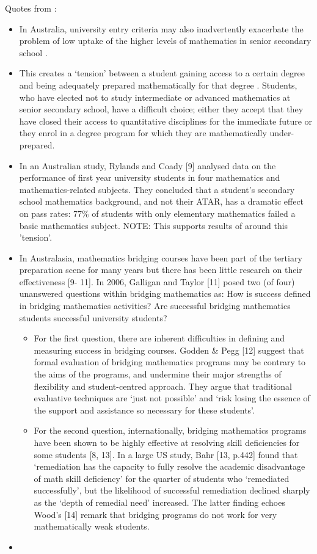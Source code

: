 \documentclass[twoside,12pt,a4paper]{report}
\begin{document}
Quotes from \cite{Poladian2013}:
\begin{itemize}
	\item In Australia, university entry criteria may also inadvertently exacerbate the problem
of low uptake of the higher levels of mathematics in senior secondary school \cite{Varsavsky2010}.
	\item This creates a ‘tension’
between a student gaining access to a certain degree and being adequately prepared
mathematically for that degree \cite{Gordon2013b}. Students, who have elected not to study intermediate or
advanced mathematics at senior secondary school, have a difficult choice; either they accept
that they have closed their access to quantitative disciplines for the immediate future or they
enrol in a degree program for which they are mathematically under-prepared.
	\item In an Australian study, Rylands and
Coady [9] analysed data on the performance of first year university students in four
mathematics and mathematics-related subjects. They concluded that a student’s secondary
school mathematics background, and not their ATAR, has a dramatic effect on pass rates:
77\% of students with only elementary mathematics failed a basic mathematics subject. NOTE: This supports results of \cite{Kajander2005} around this 'tension'.
	\item In Australasia, mathematics bridging courses have been part of the tertiary
preparation scene for many years but there has been little research on their effectiveness [9-
11]. In 2006, Galligan and Taylor [11] posed two (of four) unanswered questions within
bridging mathematics as:
How is success defined in bridging mathematics activities?
Are successful bridging mathematics students successful university students?
	\begin{itemize}
		\item For the first question, there are inherent difficulties in defining and measuring success
in bridging courses. Godden \& Pegg [12] suggest that formal evaluation of bridging
mathematics programs may be contrary to the aims of the programs, and undermine their
major strengths of flexibility and student-centred approach. They argue that traditional
evaluative techniques are ‘just not possible’ and ‘risk losing the essence of the support and
assistance so necessary for these students’.
		\item For the second question, internationally, bridging mathematics programs have been
shown to be highly effective at resolving skill deficiencies for some students [8, 13]. In a
large US study, Bahr [13, p.442] found that ‘remediation has the capacity to fully resolve the
academic disadvantage of math skill deficiency’ for the quarter of students who ‘remediated
successfully’, but the likelihood of successful remediation declined sharply as the ‘depth of
remedial need’ increased. The latter finding echoes Wood’s [14] remark that bridging
programs do not work for very mathematically weak students.
	\end{itemize}
	\item 
\end{itemize}
\end{document}
